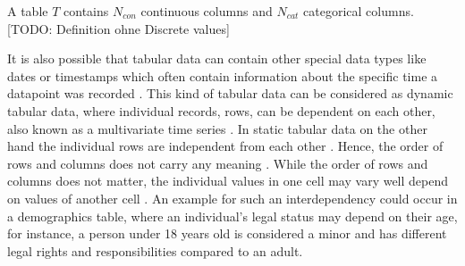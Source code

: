 \begin{displayquote}
A table $T$ contains $N_{con}$ continuous columns and $N_{cat}$ categorical columns. [TODO: Definition ohne Discrete values]
\end{displayquote}

It is also possible that tabular data can contain other special data types like dates or timestamps which often contain information about the specific time a datapoint was recorded \cite{hernandez2022SyntheticDataGeneration}.
This kind of tabular data can be considered as dynamic tabular data, where individual records, \ie rows, can be dependent on each other, also known as a multivariate time series \cite{padhi2021TabularTransformersModeling}.
In static tabular data on the other hand the individual rows are independent from each other \cite{padhi2021TabularTransformersModeling}.
Hence, the order of rows and columns does not carry any meaning \cite{somepalli2021SAINTImprovedNeural}.
While the order of rows and columns does not matter, the individual values in one cell may vary well depend on values of another cell \cite{lederrey2022DATGANIntegratingExperta}.
An example for such an interdependency could occur in a demographics table, where an individual's legal status may depend on their age, 
for instance, a person under 18 years old is considered a minor and has different legal rights and responsibilities compared to an adult.

